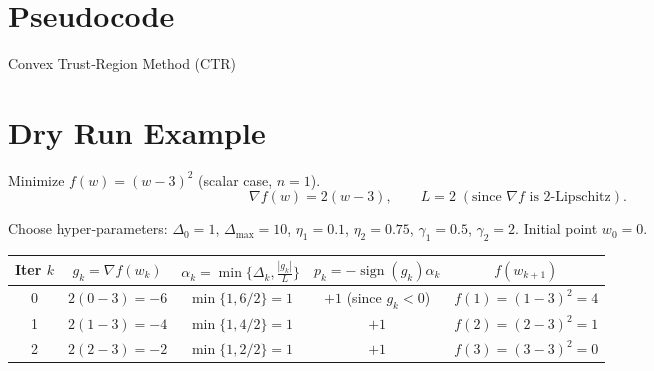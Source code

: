 \documentclass{article}
\newcommand{\norm}[1]{\left\lVert#1\right\rVert}
\begin{document}
\section*{Pseudocode}
\begin{algorithm}[H]
\caption{Convex Trust‑Region Method (CTR)}
\begin{algorithmic}[1]
\State \textbf{Input:} $x_0\in\mathbb{R}^n$, $\Delta_0>0$, $L>0$, $\Delta_{\max}>0$,
\State \hspace{1.8cm} $\eta_1,\eta_2\in(0,1)$, $\gamma_1\in(0,1)$, $\gamma_2>1$,
\State \textbf{Initialize:} $k\gets0$, $\Delta_k\gets\Delta_0$.
    \State $g_k\gets\nabla f(x_k)$.
    \State $\displaystyle \alpha_k \gets \min\!\Big\{\Delta_k,\;\frac{\norm{g_k}}{L}\Big\}$.
    \State $p_k \gets -\frac{g_k}{\norm{g_k}}\alpha_k$ \quad (Cauchy point)}.
    \State Compute actual reduction $a_k:=f(x_k)-f(x_k+p_k)$.
    \State Predicted reduction $p_k^{\text{pred}}:= -g_k^{\!\top}p_k-\frac{L}{2}\norm{p_k}^2$.
    \State $\rho_k \gets a_k / p_k^{\text{pred}}$.
    \If{$\rho_k\ge \eta_1$}
        \State $x_{k+1}\gets x_k+p_k$ \Comment{Accept}
    \Else
        \State $x_{k+1}\gets x_k$        \Comment{Reject}
    \EndIf
    \If{$\rho_k\ge \eta_2$}
        \State $\Delta_{k+1}\gets \min\{\gamma_2\Delta_k,\;\Delta_{\max}\}$.
    \ElsIf{$\rho_k<\eta_1$}
        \State $\Delta_{k+1}\gets \gamma_1\Delta_k$.
    \Else
        \State $\Delta_{k+1}\gets \Delta_k$.
    \EndIf
    \State $k\gets k+1$.
\EndWhile
\State \textbf{Output:} $x_k$.
\end{algorithmic}
\end{algorithm}

\section*{Dry Run Example}
Minimize $f(w)=(w-3)^2$ (scalar case, $n=1$).  
\[
\nabla f(w)=2(w-3),\qquad L=2\;(\text{since } \nabla f \text{ is }2\text{-Lipschitz}).
\]

Choose hyper‑parameters: $\Delta_0=1$, $\Delta_{\max}=10$, $\eta_1=0.1$, $\eta_2=0.75$, $\gamma_1=0.5$, $\gamma_2=2$.  
Initial point $w_0=0$.

\begin{center}
\begin{tabular}{c|c|c|c|c}
Iter $k$ & $g_k= \nabla f(w_k)$ & $\alpha_k=\min\{\Delta_k,\frac{|g_k|}{L}\}$ & $p_k=-\operatorname{sign}(g_k)\alpha_k$ & $f(w_{k+1})$\\\hline
0 & $2(0-3)=-6$ & $\min\{1,6/2\}=1$ & $+1$ (since $g_k<0$) & $f(1)=(1-3)^2=4$\\
1 & $2(1-3)=-4$ & $\min\{1,4/2\}=1$ & $+1$ & $f(2)=(2-3)^2=1$\\
2 & $2(2-3)=-2$ & $\min\{1,2/2\}=1$ & $+1$ & $f(3)=(3-3)^2=0$\\
\end{tabular}
\end{center}
\end{document}
